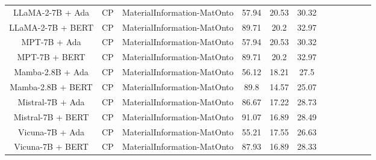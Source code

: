 \begin{table}
\begin{tabular}{|c|c|c|c|c|c|c|c|c|c|c|c|}
	LLaMA-2-7B + Ada  & CP & MaterialInformation-MatOnto  &  57.94 &  20.53 & 30.32  \\
	LLaMA-2-7B + BERT  & CP & MaterialInformation-MatOnto  &  89.71 &  20.2 & 32.97  \\
	MPT-7B + Ada  & CP & MaterialInformation-MatOnto  &  57.94 &  20.53 & 30.32  \\
	MPT-7B + BERT  & CP & MaterialInformation-MatOnto  &  89.71 &  20.2 & 32.97  \\
	Mamba-2.8B + Ada  & CP & MaterialInformation-MatOnto  &  56.12 &  18.21 & 27.5  \\
	Mamba-2.8B + BERT  & CP & MaterialInformation-MatOnto  &  89.8 &  14.57 & 25.07  \\
	Mistral-7B + Ada  & CP & MaterialInformation-MatOnto  &  86.67 &  17.22 & 28.73  \\
	Mistral-7B + BERT  & CP & MaterialInformation-MatOnto  &  91.07 &  16.89 & 28.49  \\
	Vicuna-7B + Ada  & CP & MaterialInformation-MatOnto  &  55.21 &  17.55 & 26.63  \\
	Vicuna-7B + BERT  & CP & MaterialInformation-MatOnto  &  87.93 &  16.89 & 28.33  \\
	\hline
\end{tabular}
    \end{table}
